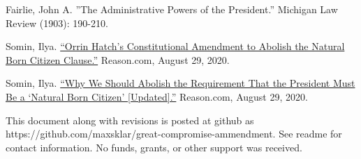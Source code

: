 \documentclass{article}
\begin{document}
\begin{thebibliography}{20}
Fairlie, John A. ”The Administrative Powers of the President.” Michigan Law Review (1903): 190-210.

Somin, Ilya. \href{https://reason.com/volokh/2020/08/16/orrin-hatchs-constitutional-amendment-to-abolish-the-natural-born-citizen-clause/}{“Orrin Hatch’s Constitutional Amendment to Abolish the Natural Born Citizen Clause.”} Reason.com, August 29, 2020.

Somin, Ilya. \href{https://reason.com/volokh/2020/08/14/why-we-should-abolish-the-requirement-that-the-president-must-be-a-natural-born-citizen/}{“Why We Should Abolish the Requirement That the President Must Be a ‘Natural Born Citizen’ [Updated].”} Reason.com, August 29, 2020. 

\end{thebibliography}

This document along with revisions is posted at github as https://github.com/maxsklar/great-compromise-ammendment. See readme for contact information. No funds, grants, or other support was received.
\end{document}
